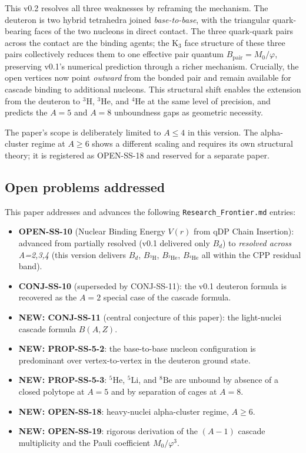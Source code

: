 \documentclass[11pt,letterpaper]{article}
\newcommand{\phig}{\varphi}
\newcommand{\Mzero}{M_0}
\newcommand{\Bpair}{B_{\mathrm{pair}}}
\newcommand{\Bd}{B_{d}}
\begin{document}
This v0.2 resolves all three weaknesses by reframing the mechanism. The deuteron is two hybrid tetrahedra joined \emph{base-to-base}, with the triangular quark-bearing faces of the two nucleons in direct contact. The three quark-quark pairs across the contact are the binding agents; the K$_3$ face structure of these three pairs collectively reduces them to one effective pair quantum $\Bpair = \Mzero/\phig$, preserving v0.1's numerical prediction through a richer mechanism. Crucially, the open vertices now point \emph{outward} from the bonded pair and remain available for cascade binding to additional nucleons. This structural shift enables the extension from the deuteron to ${}^{3}\mathrm{H}$, ${}^{3}\mathrm{He}$, and ${}^{4}\mathrm{He}$ at the same level of precision, and predicts the $A=5$ and $A=8$ unboundness gaps as geometric necessity.

The paper's scope is deliberately limited to $A \leq 4$ in this version. The alpha-cluster regime at $A \geq 6$ shows a different scaling and requires its own structural theory; it is registered as OPEN-SS-18 and reserved for a separate paper.

\subsection{Open problems addressed}
\label{sec:open_problems}

This paper addresses and advances the following \texttt{Research\_Frontier.md} entries:
\begin{itemize}
\item \textbf{OPEN-SS-10} (Nuclear Binding Energy $V(r)$ from qDP Chain Insertion): advanced from partially resolved (v0.1 delivered only $\Bd$) to \emph{resolved across A=2,3,4} (this version delivers $\Bd$, $B_{^{3}\mathrm{H}}$, $B_{^{3}\mathrm{He}}$, $B_{^{4}\mathrm{He}}$ all within the CPP residual band).
\item \textbf{CONJ-SS-10} (superseded by CONJ-SS-11): the v0.1 deuteron formula is recovered as the $A=2$ special case of the cascade formula.
\item \textbf{NEW: CONJ-SS-11} (central conjecture of this paper): the light-nuclei cascade formula $B(A,Z)$.
\item \textbf{NEW: PROP-SS-5-2}: the base-to-base nucleon configuration is predominant over vertex-to-vertex in the deuteron ground state.
\item \textbf{NEW: PROP-SS-5-3}: ${}^{5}\mathrm{He}$, ${}^{5}\mathrm{Li}$, and ${}^{8}\mathrm{Be}$ are unbound by absence of a closed polytope at $A=5$ and by separation of cages at $A=8$.
\item \textbf{NEW: OPEN-SS-18}: heavy-nuclei alpha-cluster regime, $A \geq 6$.
\item \textbf{NEW: OPEN-SS-19}: rigorous derivation of the $(A-1)$ cascade multiplicity and the Pauli coefficient $\Mzero/\phig^3$.
\end{itemize}
\end{document}
